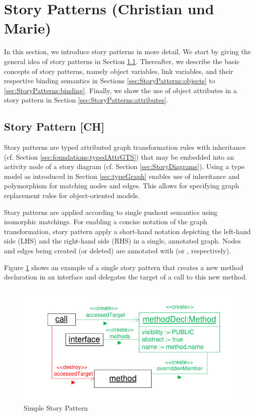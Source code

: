 \section{Story Patterns (Christian und Marie)} \label{sec:StoryPatterns}

In this section, we introduce story patterns in more detail.
We start by giving the general idea of story patterns in Section \ref{sec:StoryPatterns:storyPattern}.
Thereafter, we describe the basic concepts of story patterns, namely object variables, link variables,
and their respective binding semantics in Sections \ref{sec:StoryPatterns:objects} to \ref{sec:StoryPatterns:binding}.
Finally, we show the use of object attributes in a story pattern in Section \ref{sec:StoryPatterns:attributes}.


\subsection{Story Pattern [CH]}
\label{sec:StoryPatterns:storyPattern}

Story patterns are typed attributed graph transformation rules with inheritance (cf. Section \ref{sec:foundations:typedAttrGTS}) that may be embedded into an activity node of a story diagram (cf. Section \ref{sec:StoryDiagrams}). Using a type model as introduced in Section \ref{sec:typeGraph} enables use of inheritance and polymorphism for matching nodes and edges.
This allows for specifying graph replacement rules for object-oriented models.

Story patterns are applied according to single pushout semantics using isomorphic matchings.
For enabling a concise notation of the graph transformation, story pattern apply a short-hand notation depicting the left-hand side (LHS) and the right-hand side (RHS) in a single, annotated graph. Nodes and edges being created (or deleted) are annotated with \create (or  \destroy, respectively).

Figure \ref{fig:simpleStoryPattern} shows an example of a single story pattern that creates a new method declaration in an interface and delegates the target of a call to this new method.

\begin{figure}[htbp]
  \centering
  \includegraphics[scale=1.0]{figures/SimpleStoryPattern}
  \caption{Simple Story Pattern}
  \label{fig:simpleStoryPattern}
\end{figure}

